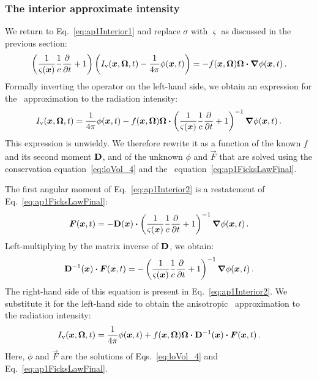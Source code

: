\subsubsection{The interior approximate intensity}

We return to Eq.~\eqref{eq:ap1Interior1} and replace $\sigma$ with $\varsigma$
as discussed in the previous section:
\begin{equation*}
  \left( \frac{1}{\varsigma(\bm{x})} \frac{1}{c}\frac{\partial }{\partial t} + 1 \right)
  \left( I_\mathrm{v}(\bm{x},\bm{\Omega},t) - \frac{1}{4\pi} \phi(\bm{x},t) \right)
  = - f(\bm{x},\bm{\Omega}) \bm{\Omega}\bm{\cdot} \bm{\nabla} \phi(\bm{x}, t) \,.
\end{equation*}
Formally inverting the operator on the left-hand side, we obtain an expression
for the \APone\ approximation to the radiation intensity:
\begin{equation}\label{eq:ap1Interior2}
 I_\mathrm{v}(\bm{x},\bm{\Omega},t)
 =
 \frac{1}{4\pi} \phi(\bm{x},t)
 - f(\bm{x},\bm{\Omega}) \bm{\Omega} \bm{\cdot}
  \left( \frac{1}{\varsigma(\bm{x})} \frac{1}{c}\frac{\partial }{\partial t} + 1 \right)^{-1} 
  \bm{\nabla} \phi(\bm{x}, t) \,.
\end{equation}
This expression is unwieldy. We
therefore rewrite it as a function of the known $f$ and its
second moment $\mathbf{D}$, and of the unknown $\phi$ and $\vec{F}$ that are
solved using the conservation equation~\eqref{eq:loVol_4} and
the \APone\ equation~\eqref{eq:ap1FicksLawFinal}.

The first angular moment of Eq.~\eqref{eq:ap1Interior2} is a restatement of
Eq.~\eqref{eq:ap1FicksLawFinal}:
\begin{equation*}
  \bm{F}(\bm{x},t)
  =
 - \mathbf{D}(\bm{x}) \bm{\cdot}
 \left( \frac{1}{\varsigma(\bm{x})} \frac{1}{c}\frac{\partial }{\partial t} + 1 \right)^{-1}
 \bm{\nabla} \phi(\bm{x}, t) \,.
\end{equation*}
Left-multiplying by the matrix inverse of $\mathbf{D}$, we obtain:
\begin{equation*}
  \mathbf{D}^{-1}(\bm{x}) \bm{\cdot} \bm{F}(\bm{x},t)
  =
 - \left( \frac{1}{\varsigma(\bm{x})} \frac{1}{c}\frac{\partial }{\partial t} + 1 \right)^{-1}
 \bm{\nabla} \phi(\bm{x}, t) \,.
\end{equation*}
The right-hand side of this equation is present in Eq.~\eqref{eq:ap1Interior2}.
We substitute it for the left-hand side to obtain the anisotropic \Pone\
approximation to the radiation intensity:
\begin{equation}\label{eq:ap1InteriorFinal}
 I_\mathrm{v}(\bm{x},\bm{\Omega},t)
 =
 \frac{1}{4\pi} \phi(\bm{x},t)
 + f(\bm{x},\bm{\Omega}) \bm{\Omega} \bm{\cdot}
  \mathbf{D}^{-1}(\bm{x}) \bm{\cdot} \bm{F}(\bm{x},t) \,.
\end{equation}
Here, $\phi$ and $\vec{F}$ are the solutions of Eqs.~\eqref{eq:loVol_4} and
Eq.~\eqref{eq:ap1FicksLawFinal}.

